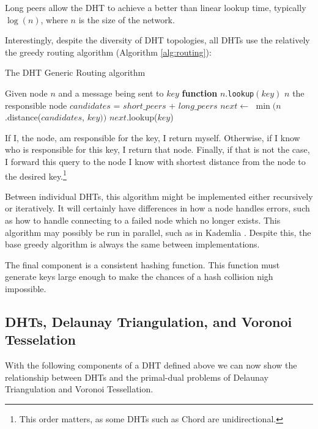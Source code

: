 \documentclass[11pt,conference]{IEEEtran}
\begin{document}
Long peers allow the DHT to achieve a better than linear lookup time, typically $ \log(n) $, where $n$ is the size of the network. 

Interestingly, despite the diversity of DHT topologies, all DHTs use the relatively the greedy routing algorithm (Algorithm \ref{alg:routing}):

\begin{algorithm}
	\caption{The DHT Generic Routing algorithm}
	\label{alg:routing}
	\begin{algorithmic}[1]
		\STATE Given node $n$ and a message being sent to $key$
		\STATE \textbf{function} $n.$\texttt{lookup}$(key)$
			\RETURN $ n $
		\ENDIF
			\RETURN the responsible node
		\ENDIF
		\STATE $ candidates $ = $ short\_peers $ + $ long\_peers $
		\STATE $ next  \leftarrow $  $\min (n$.distance($candidates$, $ key ))$
		\RETURN $next.$lookup($key$)
	\end{algorithmic}
	
	\scriptsize
\end{algorithm}
If I, the node, am responsible for the key, I return myself.
Otherwise, if I know who is responsible for this key, I return that node.
Finally, if that is not the case, I forward this query to the node I know with shortest distance from the node to the desired key.\footnote{This order matters, as some DHTs such as Chord are unidirectional.} 

Between individual DHTs, this algorithm might be implemented either recursively or iteratively.
It will certainly have differences in how a node handles errors, such as how to handle connecting to a failed node which no longer exists.
This algorithm may possibly be  run in parallel, such as in Kademlia \cite{kademlia}.
Despite this, the base greedy algorithm is always the same between implementations.

The final component is a consistent hashing function.
This function must generate keys large enough to make the chances of a hash collision nigh impossible.

\subsection{DHTs, Delaunay Triangulation, and Voronoi Tesselation}
With the following components of a DHT defined above we can now show the relationship between DHTs and the primal-dual problems of Delaunay Triangulation and Voronoi Tessellation.
\end{document}
